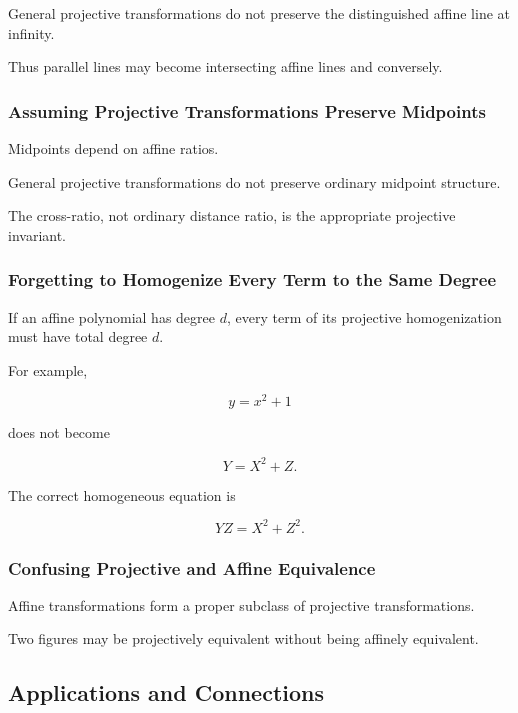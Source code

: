 General projective transformations do not preserve the distinguished affine
line at infinity.

Thus parallel lines may become intersecting affine lines and conversely.

\subsubsection{Assuming Projective Transformations Preserve Midpoints}

Midpoints depend on affine ratios.

General projective transformations do not preserve ordinary midpoint
structure.

The cross-ratio, not ordinary distance ratio, is the appropriate projective
invariant.

\subsubsection{Forgetting to Homogenize Every Term to the Same Degree}

If an affine polynomial has degree \(d\), every term of its projective
homogenization must have total degree \(d\).

For example,

\[
y=x^2+1
\]

does not become

\[
Y=X^2+Z.
\]

The correct homogeneous equation is

\[
\boxed{YZ=X^2+Z^2.}
\]

\subsubsection{Confusing Projective and Affine Equivalence}

Affine transformations form a proper subclass of projective
transformations.

Two figures may be projectively equivalent without being affinely equivalent.

\subsection{Applications and Connections}
\label{subsec:projective-applications}

